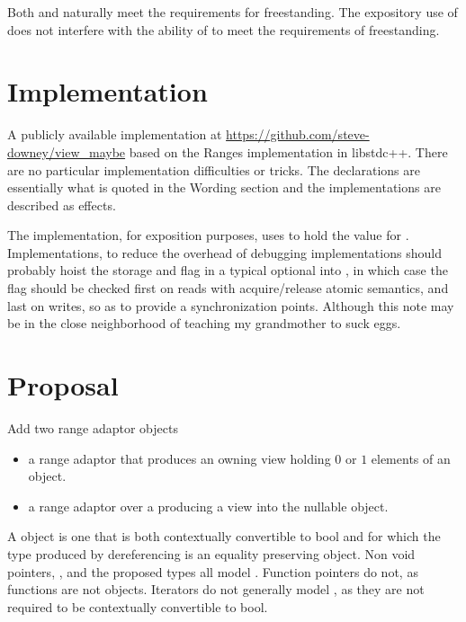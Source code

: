 \documentclass[a4paper,10pt,oneside,openany,final,article]{memoir}
\begin{document}
Both  and  naturally meet the requirements for freestanding. The expository use of  does not interfere with the ability of  to meet the requirements of freestanding.


\chapter{Implementation}

A publicly available implementation at \url{https://github.com/steve-downey/view_maybe} based on the Ranges implementation in libstdc++. There are no particular implementation difficulties or tricks. The declarations are essentially what is quoted in the Wording section and the implementations are described as effects.

The implementation, for exposition purposes, uses  to hold the value for . Implementations, to reduce the overhead of debugging implementations should probably hoist the storage and flag in a typical optional into , in which case the flag should be checked first on reads with acquire/release atomic semantics, and last on writes, so as to provide a synchronization points. Although this note may be in the close neighborhood of teaching my grandmother to suck eggs.

\chapter{Proposal}
Add two range adaptor objects
\begin{itemize}
\item
   a range adaptor that produces an owning view holding $0$ or $1$ elements of an object.
\item
   a range adaptor over a  producing a view into the nullable object.
\end{itemize}

A  object is one that is both contextually convertible to bool and for which the type produced by dereferencing is an equality preserving object. Non void pointers, , and the proposed  \cite{P0323R9} types all model . Function pointers do not, as functions are not objects. Iterators do not generally model , as they are not required to be contextually convertible to bool.
\end{document}
